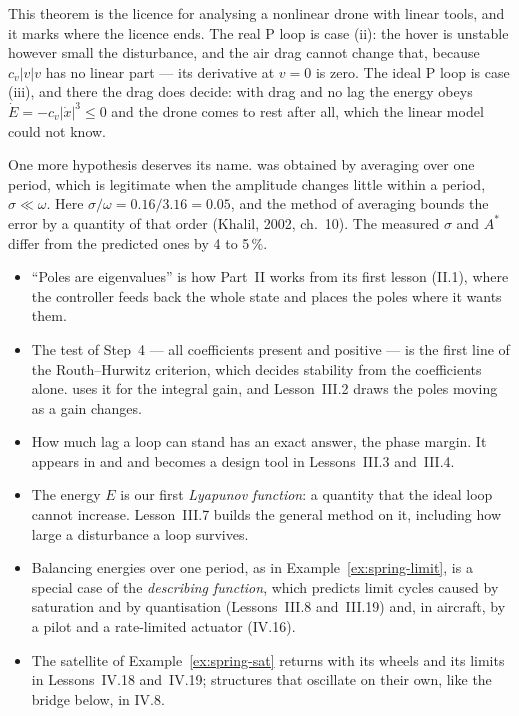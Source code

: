 This theorem is the licence for analysing a nonlinear drone with linear tools, and it marks where the licence ends. The real P loop is case (ii): the hover is unstable however small the disturbance, and the air drag cannot change that, because $c_v|v|v$ has no linear part — its derivative at $v = 0$ is zero. The ideal P loop is case (iii), and there the drag does decide: with drag and no lag the energy obeys $\dot E = -c_v|\dot x|^3 \le 0$ and the drone comes to rest after all, which the linear model could not know.

One more hypothesis deserves its name.  was obtained by averaging over one period, which is legitimate when the amplitude changes little within a period, $\sigma \ll \omega$. Here $\sigma/\omega = 0.16/3.16 = 0.05$, and the method of averaging bounds the error by a quantity of that order (Khalil, 2002, ch.~10). The measured $\sigma$ and $A^*$ differ from the predicted ones by 4 to 5\,\%.

\begin{lookahead}
\begin{itemize}[leftmargin=1.2em]
  \item \enquote{Poles are eigenvalues} is how Part~II works from its first lesson (II.1), where the controller feeds back the whole state and places the poles where it wants them.
  \item The test of Step~4 — all coefficients present and positive — is the first line of the Routh–Hurwitz criterion, which decides stability from the coefficients alone.  uses it for the integral gain, and Lesson~III.2 draws the poles moving as a gain changes.
  \item How much lag a loop can stand has an exact answer, the phase margin. It appears in  and  and becomes a design tool in Lessons~III.3 and~III.4.
  \item The energy $E$ is our first \emph{Lyapunov function}: a quantity that the ideal loop cannot increase. Lesson~III.7 builds the general method on it, including how large a disturbance a loop survives.
  \item Balancing energies over one period, as in Example~\ref{ex:spring-limit}, is a special case of the \emph{describing function}, which predicts limit cycles caused by saturation and by quantisation (Lessons~III.8 and~III.19) and, in aircraft, by a pilot and a rate-limited actuator (IV.16).
  \item The satellite of Example~\ref{ex:spring-sat} returns with its wheels and its limits in Lessons~IV.18 and~IV.19; structures that oscillate on their own, like the bridge below, in IV.8.
\end{itemize}
\end{lookahead}

